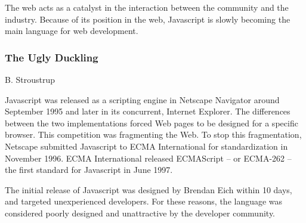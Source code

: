 The web acts as a catalyst in the interaction between the community and the industry.
Because of its position in the web, Javascript is slowly becoming the main language for web development.


\subsubsection{The Ugly Duckling}

%
{B. Stroustrup}



Javascript was released as a scripting engine in Netscape Navigator around September 1995 and later in its concurrent, Internet Explorer.
The differences between the two implementations forced Web pages to be designed for a specific browser.
This competition was fragmenting the Web.
To stop this fragmentation, Netscape submitted Javascript to ECMA International for standardization in November 1996.
ECMA International released  ECMAScript -- or ECMA-262 -- the first standard for Javascript in June 1997. %

The initial release of Javascript was designed by Brendan Eich within 10 days, and targeted unexperienced developers.
For these reasons, the language was considered poorly designed and unattractive by the developer community.



